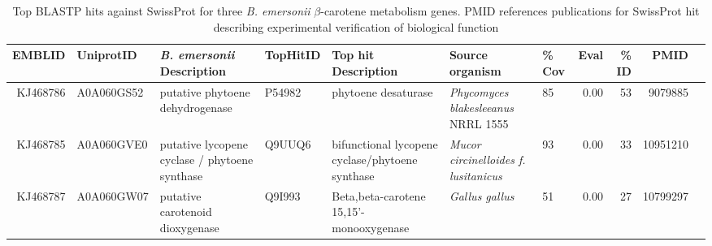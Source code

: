\begin{landscape}
\begin{table}[hp]
\caption[BLASTP results for \textit{B. emersonii} $\beta$-carotene genes]{Top BLASTP hits against SwissProt for three \textit{B. emersonii} $\beta$-carotene metabolism genes. PMID references publications for SwissProt hit describing experimental verification of biological function} 
\label{tab:ChClat_BemeVerify}
\begin{tabular}{rllllllrrrr}
  \hline
\hline
  EMBLID & UniprotID & \emph{B. emersonii} Description & TopHitID & Top hit Description & Source organism & \% Cov & Eval & \% ID & PMID \\ 
  \hline
  KJ468786 & A0A060GS52 & putative phytoene dehydrogenase & P54982 & phytoene desaturase & \emph{Phycomyces blakesleeanus} NRRL 1555 &  85 & 0.00 &  53 & 9079885 \\ 
  KJ468785 & A0A060GVE0 & putative lycopene cyclase / phytoene synthase & Q9UUQ6 & bifunctional lycopene cyclase/phytoene synthase & \emph{Mucor circinelloides f. lusitanicus} &  93 & 0.00 &  33 & 10951210 \\ 
  KJ468787 & A0A060GW07 & putative carotenoid dioxygenase & Q9I993 & Beta,beta-carotene 15,15'-monooxygenase & \emph{Gallus gallus} &  51 & 0.00 &  27 & 10799297 \\ 
   \hline
\hline
\end{tabular}
\end{table}
\end{landscape}


